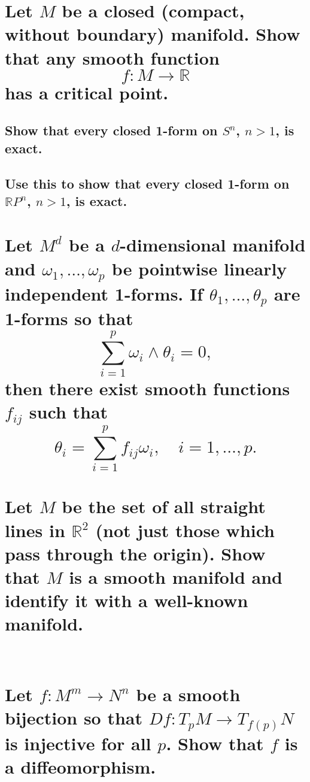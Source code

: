 \documentclass[10pt]{article}
\begin{document}
 

\section{Let $M$ be a closed (compact, without boundary) manifold. Show that any
  smooth function $$f: M \to \mathbb{R} $$ has a critical point.}

\advsection{}

\subsection{Show that every closed 1-form on $S^n$, $n>1$, is exact.}

\subsection{Use this to show that every closed 1-form on $\mathbb{R} P^n$, $n>1$, is exact.}

\section{Let $M^d$ be a $d$-dimensional manifold and $\omega_1, \dots, \omega_p$
  be pointwise linearly independent 1-forms. If $\theta_1, \dots, \theta_p$ are
  1-forms so that 
$$\sum_{i=1}^p \omega_i \wedge \theta_i =0,$$
then there exist smooth functions $f_{ij}$ such that $$\theta_i = \sum_{i=1}^p f_{ij} \omega_i,
\quad i=1, \dots, p.$$ }

\section{Let $M$ be the set of all straight lines in $\mathbb{R} ^2$ (not just those which pass
  through the origin). Show that $M$ is a smooth manifold and identify it with a well-known
  manifold.  \\\\ }

\section{Let $f: M^m \to N^n$ be a smooth bijection so that $Df: T_p M \to T_{f(p)}N$ is injective
  for all $p$. Show that $f$ is a diffeomorphism.}
\end{document}

